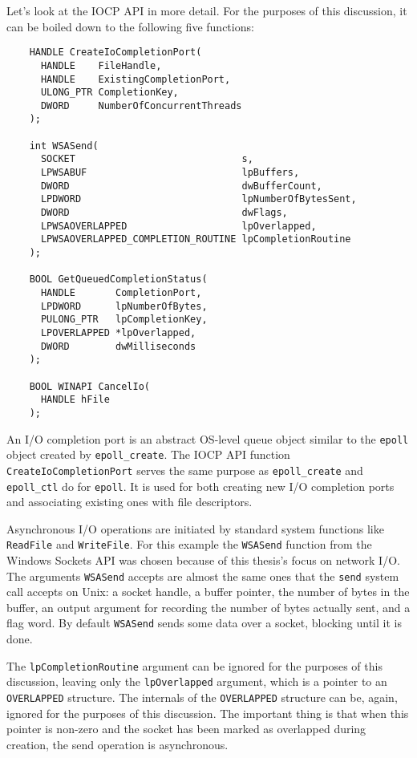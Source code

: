 \documentclass[a4paper,11pt,oneside]{report}
\begin{document}
Let's look at the IOCP API in more detail. For the purposes of this discussion,
it can be boiled down to the following five functions:

\begin{verbatim}
    HANDLE CreateIoCompletionPort(
      HANDLE    FileHandle,
      HANDLE    ExistingCompletionPort,
      ULONG_PTR CompletionKey,
      DWORD     NumberOfConcurrentThreads
    );

    int WSASend(
      SOCKET                             s,
      LPWSABUF                           lpBuffers,
      DWORD                              dwBufferCount,
      LPDWORD                            lpNumberOfBytesSent,
      DWORD                              dwFlags,
      LPWSAOVERLAPPED                    lpOverlapped,
      LPWSAOVERLAPPED_COMPLETION_ROUTINE lpCompletionRoutine
    );

    BOOL GetQueuedCompletionStatus(
      HANDLE       CompletionPort,
      LPDWORD      lpNumberOfBytes,
      PULONG_PTR   lpCompletionKey,
      LPOVERLAPPED *lpOverlapped,
      DWORD        dwMilliseconds
    );

    BOOL WINAPI CancelIo(
      HANDLE hFile
    );
\end{verbatim}

An I/O completion port is an abstract OS-level queue object similar to the
\texttt{epoll} object created by \texttt{epoll\_create}. The IOCP API function
\texttt{CreateIoCompletionPort} serves the same purpose as
\texttt{epoll\_create} and \texttt{epoll\_ctl} do for \texttt{epoll}. It is used
for both creating new I/O completion ports and associating existing ones with
file descriptors.

Asynchronous I/O operations are initiated by standard system functions like
\texttt{ReadFile} and \texttt{WriteFile}. For this example the \texttt{WSASend}
function from the Windows Sockets API was chosen because of this thesis's focus
on network I/O. The arguments \texttt{WSASend} accepts are almost the same ones
that the \texttt{send} system call accepts on Unix: a socket handle, a buffer
pointer, the number of bytes in the buffer, an output argument for recording the
number of bytes actually sent, and a flag word. By default \texttt{WSASend}
sends some data over a socket, blocking until it is done.

The \texttt{lpCompletionRoutine} argument can be ignored for the purposes of
this discussion, leaving only the \texttt{lpOverlapped} argument, which is a
pointer to an \texttt{OVERLAPPED} structure. The internals of the
\texttt{OVERLAPPED} structure can be, again, ignored for the purposes of this
discussion. The important thing is that when this pointer is non-zero and the
socket has been marked as overlapped during creation, the send operation is
asynchronous.
\end{document}
